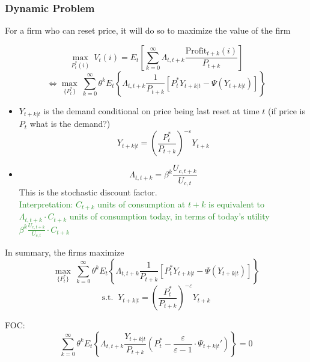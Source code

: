 \documentclass{article}
\begin{document}
\subsubsection{Dynamic Problem}
For a firm who can reset price, it will do so to maximize the value of the firm

$$\max_{P_t^* (i)}\ V_t(i) = E_t\left[\sum_{k=0}^\infty \Lambda_{t, t+k} \frac{\text{Profit}_{t+k}(i)}{P_{t+k}} \right]$$
$$\Leftrightarrow \max_{\{P_t^*\}}\ \sum_{k=0}^\infty \theta^k E_t\left\{\Lambda_{t, t+k} \frac{1}{P_{t+k}}\left [P_t^* Y_{t+k|t} - \Psi(Y_{t+k|t})\right]\right\}$$

\begin{itemize}
    \item $Y_{t+k|t}$ is the demand conditional on price being last reset at time $t$ (if price is $P_t$ what is the demand?)
    $$Y_{t+k|t} = \left(\frac{P_t^*}{P_{t+k}}\right)^{-\varepsilon} Y_{t+k}$$
    \item $$\Lambda_{t, t+k} = \beta^k \frac{U_{c, t+k}}{U_{c,t}}$$
    This is the stochastic discount factor.\\
    \textcolor{ForestGreen}{Interpretation: $C_{t+k}$ units of consumption at $t+k$ is equivalent to $\Lambda_{t, t+k}\cdot C_{t+k}$ units of consumption today, in terms of today's utility $\beta^k \frac{U_{c, t+k}}{U_{c,t}}\cdot C_{t+k}$}
\end{itemize}

In summary, the firms maximize
$$\max_{\{P_t^*\}}\ \sum_{k=0}^\infty \theta^k E_t\left\{\Lambda_{t, t+k} \frac{1}{P_{t+k}}\left [P_t^* Y_{t+k|t} - \Psi(Y_{t+k|t})\right]\right\}$$
$$\text{s.t. }\ Y_{t+k|t} = \left(\frac{P_t^*}{P_{t+k}}\right)^{-\varepsilon} Y_{t+k}$$

FOC:
$$\sum_{k=0}^\infty \theta^k E_t\left\{\Lambda_{t, t+k} \frac{Y_{t+k|t}}{P_{t+k}}\left(P_t^* - \frac{\varepsilon}{\varepsilon - 1}\cdot \Psi_{t+k|t}'\right)\right\} = 0$$
\end{document}

